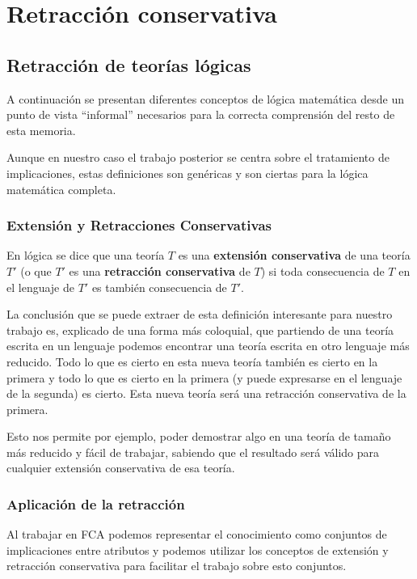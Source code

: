 \chapter*{Retracción conservativa}

	
\section*{Retracción de teorías lógicas}
	
	A continuación se presentan diferentes conceptos de lógica matemática desde un punto de vista ``informal'' necesarios para 
	la correcta comprensión del resto de esta memoria.
	
	Aunque en nuestro caso el trabajo posterior se centra sobre el tratamiento de implicaciones, estas definiciones son genéricas y 
	son ciertas para la lógica matemática completa.
	
	
\subsection*{Extensión y Retracciones Conservativas}
	
	En lógica se dice que una teoría $T$ es una \textbf{extensión conservativa} de una teoría $T'$ (o que $T'$ es una \textbf{retracción conservativa} de $T$) si toda consecuencia de $T$ en el lenguaje de $T'$ es también consecuencia de $T'$.
	
	La conclusión que se puede extraer de esta definición interesante para nuestro trabajo es, explicado de una forma más coloquial, que partiendo de una teoría escrita en un lenguaje podemos encontrar una teoría escrita en otro lenguaje más reducido. Todo lo que es cierto en esta nueva teoría también es cierto en la primera y todo lo que es cierto en la primera (y puede expresarse en el lenguaje de la segunda) es cierto. Esta nueva teoría será una retracción conservativa de la primera.
	
	Esto nos permite por ejemplo, poder demostrar algo en una teoría de tamaño más reducido y fácil de trabajar, sabiendo que el resultado será válido para cualquier extensión conservativa de esa teoría.
	
	
\subsection*{Aplicación de la retracción}
	
	Al trabajar en FCA podemos representar el conocimiento como conjuntos de implicaciones entre atributos y podemos utilizar los conceptos de extensión y retracción conservativa para facilitar el trabajo sobre esto conjuntos.
	

